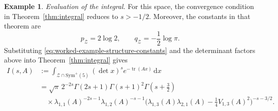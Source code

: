 \documentclass[12pt]{amsart}
\theoremstyle{plain}
\theoremstyle{definition}
\newtheorem{example}[theorem]{Example}
\theoremstyle{remark}
\newcommand{\1}{\mathbf{1}}
\newcommand{\dd}{\mathrm{d}}
\newcommand{\tr}{\operatorname{tr}}
\begin{document}
\begin{example}
\noindent\emph{Evaluation of the integral.}
For this space, the convergence condition in Theorem~\ref{thm:integral} reduces to $s>-1/2$. Moreover, the constants in that theorem are
\[
p_{\mathcal Z}=2\log2,
\qquad
q_{\mathcal Z}=-\frac12\log\pi.
\]
Substituting \eqref{eq:worked-example-structure-constants} and the determinant factors above into Theorem~\ref{thm:integral} gives
\begin{equation}\label{eq:worked-example-general-integral}
\begin{aligned}
I(s,A)
&:=\int_{\mathcal Z\cap\mathrm{Sym}^+(5)}
(\det x)^s e^{-\tr(Ax)}\,\dd x\\
&=\sqrt\pi\,2^{-2s}
\Gamma(2s+1)\Gamma(s+1)^2\Gamma\left(s+\frac32\right)\\
&\quad\times\lambda_{1,1}(A)^{-2s-1}\lambda_{1,2}(A)^{-s-1}
\bigl(\lambda_{1,3}(A)\lambda_{2,1}(A)
-\tfrac14 V_{1,3}(A)^2\bigr)^{-s-3/2}.
\end{aligned}
\end{equation}



\end{example}
\end{document}
